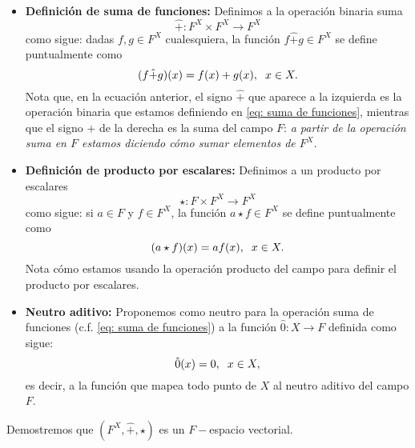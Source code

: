 \begin{itemize}
	\item \textbf{Definición de suma de funciones:}
	Definimos a la operación binaria suma
	\begin{equation}
		\label{eq: suma de funciones}
		\hat{+} : F^{X} \times F^{X} \longrightarrow F^{X}
	\end{equation}
	como sigue: dadas $f, g \in F^{X}$ cualesquiera, 
	la función $f \hat{+} g \in F^{X}$ se define puntualmente como
	\begin{equation}
		\label{eq: suma funciones puntual}
	(f \hat{+} g)(x) = f(x) + g (x), \hspace{0.2cm}
	x \in X.
	\end{equation}
	Nota que, en la ecuación anterior, el signo $\hat{+}$
	que aparece a la izquierda es la operación binaria
	que estamos definiendo en \eqref{eq: suma de funciones}, 
	mientras que el signo $+$ de la derecha es la suma
	del campo $F$: \textit{a partir de la operación
	suma en $F$ estamos diciendo cómo sumar elementos
	de $F^{X}$}.
	
	\item \textbf{Definición de producto por escalares:}
	Definimos a un producto por escalares
	\begin{equation}
		\label{eq: producto por escalares}
	\star : F \times F^{X} \longrightarrow F^{X} 	
	\end{equation}		
	como sigue: si $a \in F$ y $f \in F^{X}$, la función
	$a \star f \in F^{X}$ se define puntualmente como
	\begin{equation}
		\label{eq: definicion prod esc}
	(a \star f)(x) = a f(x), \hspace{0.2cm}
	x \in X.
	\end{equation}
	Nota cómo estamos usando la operación producto
	del campo para definir el producto por escalares.
	
	\item \textbf{Neutro aditivo:} Proponemos como 
	neutro para la operación suma de funciones (c.f. \eqref{eq: suma de funciones}) a la función $\hat{0} : X \longrightarrow F$
	definida como sigue:
	\begin{equation}
		\label{eq: funcion cero}
		\hat{0}(x) = 0, \hspace{0.2cm} x \in X,
	\end{equation}
	es decir, a la función que mapea todo punto
	de $X$ al neutro aditivo del campo $F$.
\end{itemize}

Demostremos que 
$(F^{X}, \hat{+}, \star)$
es un $F-$espacio vectorial.\\



